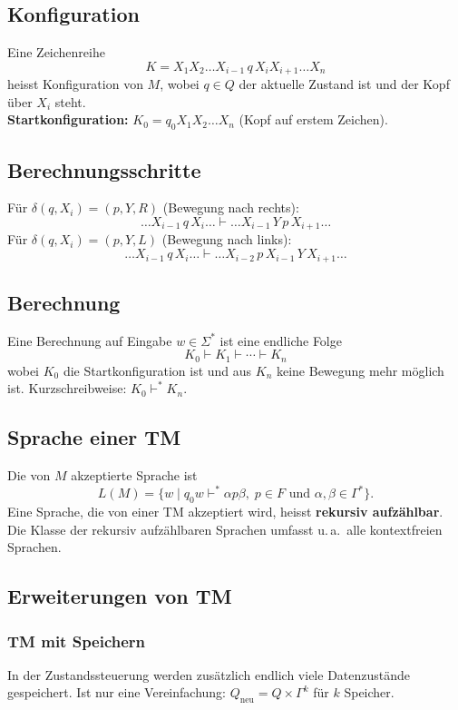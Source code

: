 \subsection{Konfiguration}
Eine Zeichenreihe
\[
    K = X_1 X_2 \ldots X_{i-1}\, q\, X_i X_{i+1} \ldots X_n
\]
heisst Konfiguration von \(M\), wobei \(q \in Q\) der aktuelle Zustand ist und der Kopf über \(X_i\) steht. \\
\textbf{Startkonfiguration:} \(K_0 = q_0 X_1 X_2 \ldots X_n\) (Kopf auf erstem Zeichen).

\subsection{Berechnungsschritte}
Für \(\delta(q, X_i) = (p, Y, R)\) (Bewegung nach rechts):
\[
    \ldots X_{i-1}\, q\, X_i \ldots \vdash \ldots X_{i-1}\, Y\, p\, X_{i+1} \ldots
\]
Für \(\delta(q, X_i) = (p, Y, L)\) (Bewegung nach links):
\[
    \ldots X_{i-1}\, q\, X_i \ldots \vdash \ldots X_{i-2}\, p\, X_{i-1}\, Y\, X_{i+1} \ldots
\]

\subsection{Berechnung}
Eine Berechnung auf Eingabe \(w \in \Sigma^*\) ist eine endliche Folge
\[
    K_0 \vdash K_1 \vdash \cdots \vdash K_n
\]
wobei \(K_0\) die Startkonfiguration ist und aus \(K_n\) keine Bewegung mehr möglich ist. Kurzschreibweise: \(K_0 \vdash^* K_n\).

\subsection{Sprache einer TM}
Die von \(M\) akzeptierte Sprache ist
\[
    L(M) = \{ w \mid q_0 w \vdash^* \alpha p \beta,\; p \in F \text{ und } \alpha, \beta \in \Gamma^* \}.
\]
Eine Sprache, die von einer TM akzeptiert wird, heisst \textbf{rekursiv aufzählbar}. Die Klasse der rekursiv aufzählbaren Sprachen umfasst u.\,a.\ alle kontextfreien Sprachen.

\subsection{Erweiterungen von TM}

\subsubsection{TM mit Speichern}
In der Zustandssteuerung werden zusätzlich endlich viele Datenzustände gespeichert.
Ist nur eine Vereinfachung: \(Q_{\text{neu}} = Q \times \Gamma^k\) für \(k\) Speicher.

